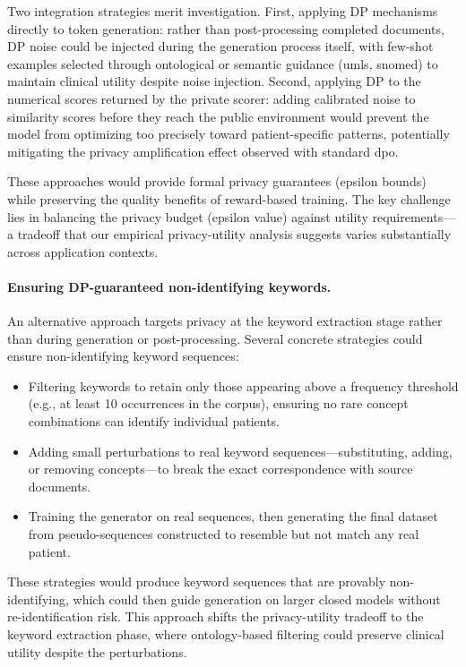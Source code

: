 Two integration strategies merit investigation.
First, applying DP mechanisms directly to token generation: rather than post-processing completed documents, DP noise could be injected during the generation process itself, with few-shot examples selected through ontological or semantic guidance (\gls{umls}, \gls{snomed}) to maintain clinical utility despite noise injection.
Second, applying DP to the numerical scores returned by the private scorer: adding calibrated noise to similarity scores before they reach the public environment would prevent the model from optimizing too precisely toward patient-specific patterns, potentially mitigating the privacy amplification effect observed with standard \gls{dpo}.

These approaches would provide formal privacy guarantees (epsilon bounds) while preserving the quality benefits of reward-based training.
The key challenge lies in balancing the privacy budget (epsilon value) against utility requirements—a tradeoff that our empirical privacy-utility analysis suggests varies substantially across application contexts.

\paragraph{Ensuring DP-guaranteed non-identifying keywords.}

An alternative approach targets privacy at the keyword extraction stage rather than during generation or post-processing.
Several concrete strategies could ensure non-identifying keyword sequences:
\begin{itemize}
    \item Filtering keywords to retain only those appearing above a frequency threshold (e.g., at least 10 occurrences in the corpus), ensuring no rare concept combinations can identify individual patients.
    \item Adding small perturbations to real keyword sequences—substituting, adding, or removing concepts—to break the exact correspondence with source documents.
    \item Training the generator on real sequences, then generating the final dataset from pseudo-sequences constructed to resemble but not match any real patient.
\end{itemize}

These strategies would produce keyword sequences that are provably non-identifying, which could then guide generation on larger closed models without re-identification risk.
This approach shifts the privacy-utility tradeoff to the keyword extraction phase, where ontology-based filtering could preserve clinical utility despite the perturbations.

